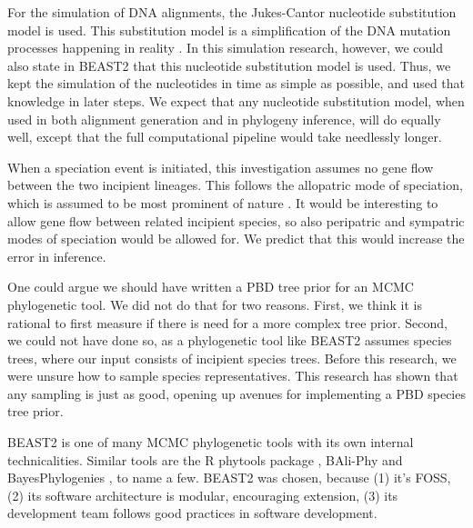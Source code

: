 \documentclass{article}
\begin{document}

For the simulation of DNA alignments, the Jukes-Cantor nucleotide substitution model
is used. This substitution model is a simplification of the DNA mutation processes
happening in reality . In this simulation research, however, we could also
state in BEAST2 that this nucleotide substitution model is used. Thus, we kept
the simulation of the nucleotides in time as simple as possible, and used that
knowledge in later steps. We expect that any nucleotide substitution model, when
used in both alignment generation and in phylogeny inference, will do equally well,
except that the full computational pipeline would take needlessly longer.


When a speciation event is initiated, this investigation assumes no gene flow
between the two incipient lineages. This follows the allopatric mode of speciation, 
which is assumed to be most prominent of nature . It would be interesting to
allow gene flow between related incipient species, 
so also peripatric and sympatric modes of speciation would be allowed for.
We predict that this would increase the error in inference.

One could argue we should have written a PBD tree prior for an MCMC phylogenetic tool.
We did not do that for two reasons. First, we think it is rational to first
measure if there is need for a more complex tree prior. Second, 
we could not have done so, as a phylogenetic tool like BEAST2 assumes species
trees, where our input consists of incipient species trees. Before this
research, we were unsure how to sample species representatives. This research
has shown that any sampling is just as good, opening up avenues for
implementing a PBD species tree prior.


BEAST2 is one of many MCMC phylogenetic tools with its
own internal technicalities. Similar tools are the R phytools
package \cite{phytools}, BAli-Phy \cite{suchard2006bali}
and BayesPhylogenies \cite{pagel2007bayesphylogenies}, to name a few.
BEAST2 was chosen, because (1) it's FOSS, (2) its software
architecture is modular, encouraging extension, (3) its development
team follows good practices in software development.

\end{document}
